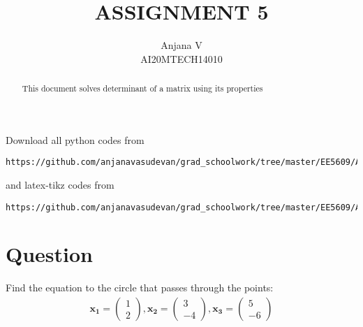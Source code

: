 \documentclass[journal,12pt,twocolumn]{IEEEtran}
\title{ASSIGNMENT 5}
\author{Anjana V\\AI20MTECH14010 }
\begin{document}
\newcommand{\myvec}[1]{\ensuremath{\begin{pmatrix}#1\end{pmatrix}}}
\newcommand{\mydet}[1]{\ensuremath{\begin{vNiceMatrix}[small]#1\end{vNiceMatrix}}}
\renewcommand{\vec}[1]{\mathbf{#1}}
\newcommand{\BAR}{%
  \hspace{-\arraycolsep}%
  \strut\vrule %
  \hspace{-\arraycolsep}%
}
\maketitle
\begin{abstract}
This document solves determinant of a matrix using its properties
\end{abstract}
Download all python codes from
%
\begin{lstlisting}
https://github.com/anjanavasudevan/grad_schoolwork/tree/master/EE5609/Assignment3/code
\end{lstlisting}
%
and latex-tikz codes from
%
\begin{lstlisting}
https://github.com/anjanavasudevan/grad_schoolwork/tree/master/EE5609/Assignment3/latex
\end{lstlisting}
%
\section{Question}
Find the equation to the circle that passes through the points:
\begin{align}
\vec{x_1} = \myvec{1\\2},\vec{x_2} = \myvec{3\\-4} , \vec{x_3} = \myvec{5\\-6}
\end{align}
\end{document}
